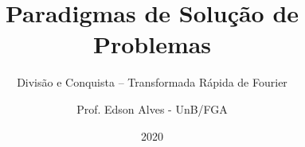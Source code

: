 \title{Paradigmas de Solução de Problemas}
\subtitle{Divisão e Conquista -- Transformada Rápida de Fourier}
\author{Prof. Edson Alves - UnB/FGA}
\date{2020}
